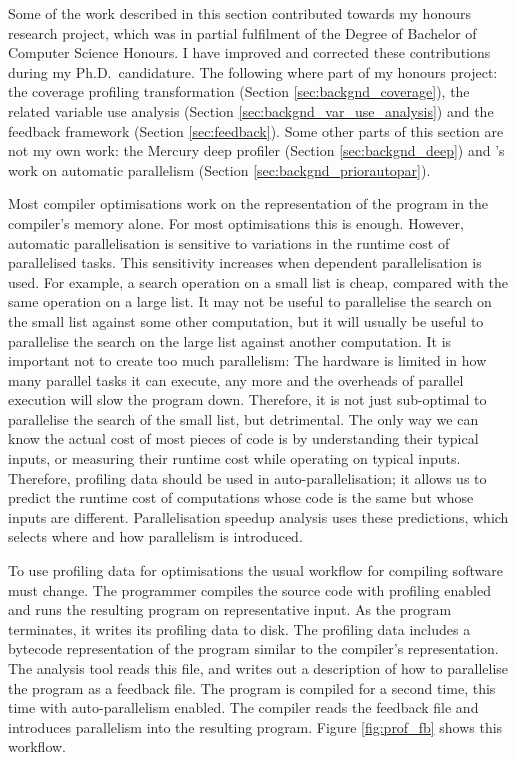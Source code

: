 

Some of the work described in this section contributed towards my honours research project,
which was in partial fulfilment of the Degree of Bachelor of Computer Science
Honours.
I have improved and corrected these contributions during my Ph.D.\
candidature.
The following where part of my honours project:
the coverage profiling transformation (Section \ref{sec:backgnd_coverage}),
the related variable use analysis (Section \ref{sec:backgnd_var_use_analysis})
and the feedback framework (Section \ref{sec:feedback}).
Some other parts of this section are not my own work:
the Mercury deep profiler \citep{conway:2001:mercury-deep} (Section
\ref{sec:backgnd_deep}) and
\citet{tannier:2007:parallel_mercury}'s work on automatic parallelism
(Section \ref{sec:backgnd_priorautopar}).

Most compiler optimisations work on the representation of the program in
the compiler's memory alone.
For most optimisations this is enough.
However,
automatic parallelisation is sensitive to variations in the runtime cost of
parallelised tasks.
This sensitivity increases when dependent parallelisation is used.
For example,
a search operation on a small list is cheap, compared with the same operation on
a large list.
It may not be useful to parallelise the search on the small list against some
other computation,
but it will usually be useful to parallelise the search on the large list
against another computation.
It is important not to create too much parallelism:
The hardware is limited in how many parallel tasks it can execute,
any more and the overheads of parallel execution will slow the program down.
Therefore, it is not just sub-optimal to parallelise the search of the small list,
but detrimental.
The only way we can know the actual cost of most pieces of code
is by understanding their typical inputs,
or measuring their runtime cost while operating on typical inputs.
Therefore,
profiling data should be used in auto-parallelisation;
it allows us to predict the runtime cost of computations whose
code is the same but whose inputs are different.
Parallelisation speedup analysis uses these predictions,
which selects where and how parallelism is introduced.

To use profiling data for optimisations the usual workflow for compiling
software must change.
The programmer compiles the source code with profiling enabled and runs the
resulting program on representative input.
As the program terminates,
it writes its profiling data to disk.
The profiling data includes a bytecode representation of the program
similar to the compiler's representation.
The analysis tool reads this file,
and writes out a description of how to parallelise the program as a feedback
file.
The program is compiled for a second time,
this time with auto-parallelism enabled.
The compiler reads the feedback file and introduces parallelism into the
resulting program.
Figure \ref{fig:prof_fb} shows this workflow.

